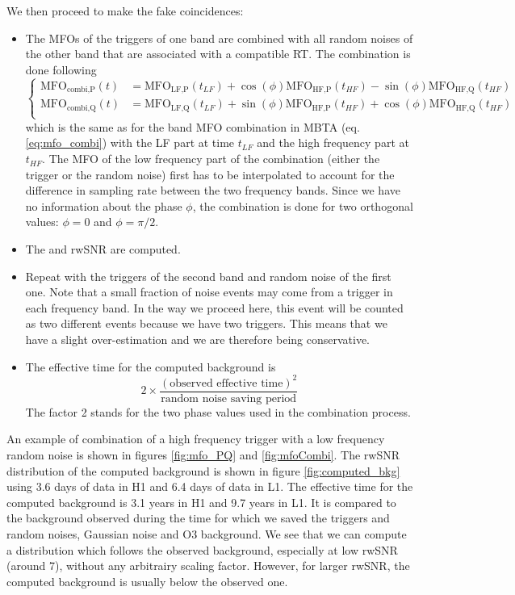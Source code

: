We then proceed to make the fake coincidences:
\begin{itemize}
\item The MFOs of the triggers of one band are combined with all random noises of the other band that are associated with a compatible RT.
  The combination is done following
\begin{equation}
  \begin{cases}
    \textrm{MFO}_{\textrm{combi,P}}(t) &= \textrm{MFO}_{\textrm{LF,P}}(t_{LF}) + \cos(\phi)\textrm{MFO}_{\textrm{HF,P}}(t_{HF}) -\sin(\phi)\textrm{MFO}_{\textrm{HF,Q}}(t_{HF})\\
    \textrm{MFO}_{\textrm{combi,Q}}(t) &= \textrm{MFO}_{\textrm{LF,Q}}(t_{LF}) + \sin(\phi)\textrm{MFO}_{\textrm{HF,P}}(t_{HF}) +\cos(\phi)\textrm{MFO}_{\textrm{HF,Q}}(t_{HF})\\
  \end{cases}
\end{equation}
which is the same as for the band MFO combination in MBTA (eq. \ref{eq:mfo_combi}) with the LF part at time $t_{LF}$ and the high frequency part at $t_{HF}$.
The MFO of the low frequency part of the combination (either the trigger or the random noise) first has to be interpolated to account for the difference in sampling rate between the two frequency bands.
Since we have no information about the phase $\phi$, the combination is done for two orthogonal values: $\phi=0$ and $\phi=\pi/2$.

\item The \achi and rwSNR are computed.

\item Repeat with the triggers of the second band and random noise of the first one.
  Note that a small fraction of noise events may come from a trigger in each frequency band.
  In the way we proceed here, this event will be counted as two different events because we have two triggers.
  This means that we have a slight over-estimation and we are therefore being conservative.

\item The effective time for the computed background is
  \begin{equation}
    2 \times \frac{(\textrm{observed effective time})^2}{\textrm{random noise saving period}}
  \end{equation}
  The factor 2 stands for the two phase values used in the combination process.
\end{itemize}
An example of combination of a high frequency trigger with a low frequency random noise is shown in figures \ref{fig:mfo_PQ} and \ref{fig:mfoCombi}.
The rwSNR distribution of the computed background is shown in figure \ref{fig:computed_bkg} using 3.6 days of data in H1 and 6.4 days of data in L1.
The effective time for the computed background is 3.1 years in H1 and 9.7 years in L1.
It is compared to the background observed during the time for which we saved the triggers and random noises, Gaussian noise and O3 background.
We see that we can compute a distribution which follows the observed background, especially at low rwSNR (around 7), without any arbitrairy scaling factor.
However, for larger rwSNR, the computed background is usually below the observed one.

